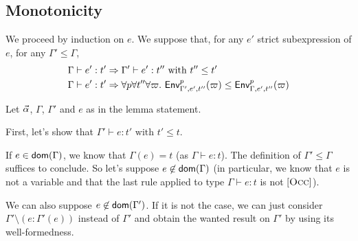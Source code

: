 \documentclass[a4paper]{article}
\theoremstyle{definition}
\begin{document}
        \subsection{Monotonicity}
    
        We proceed by induction on $e$. We suppose that, for any $e'$ strict subexpression of $e$, for any $\Gamma' \leq \Gamma$,
        \begin{align*}
          &\Gamma \vdash e':t' \Rightarrow \Gamma' \vdash e':t'' \text{ with } t'' \leq t'\\
          &\Gamma \vdash e':t' \Rightarrow \forall p \forall t'' \forall \varpi.\ \textsf{Env}^{p}_{\Gamma',e',t''} (\varpi) \leq \textsf{Env}^{p}_{\Gamma,e',t''} (\varpi)
        \end{align*}
    
        Let $\vec \alpha$, $\Gamma$, $\Gamma'$ and $e$ as in the lemma statement.

        First, let's show that $\Gamma' \vdash e:t' \text{ with } t' \leq t$.
    
        If $e\in\textsf{dom}(\Gamma)$, we know that $\Gamma(e)=t$ (as $\Gamma \vdash e:t$). The definition of $\Gamma' \leq \Gamma$ suffices to conclude.
        So let's suppose $e\not\in\textsf{dom}(\Gamma)$ (in particular, we know that $e$ is not a variable and that the last rule applied to type $\Gamma \vdash e:t$ is not $[\textsc{Occ}]$).
    
        We can also suppose $e\not\in\textsf{dom}(\Gamma')$. If it is not the case, we can just consider $\Gamma'\setminus(e:\Gamma'(e))$ instead of $\Gamma'$
        and obtain the wanted result on $\Gamma'$ by using its well-formedness.
\end{document}
